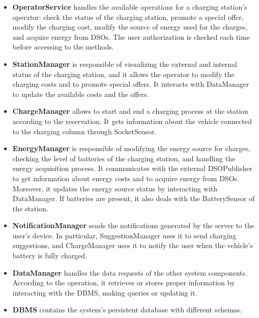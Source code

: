 \documentclass[../main.tex]{subfiles}
\begin{document}
\begin{itemize}
    \item \textbf{OperatorService} handles the available operations for a charging station's operator: check the status of the charging station, promote a special offer, modify the charging cost, modify the source of energy used for the charges, and acquire energy from DSOs. The user authorization is checked each time before accessing to the methods. 
    \item \textbf{StationManager} is responsible of visualizing the external and internal status of the charging station, and it allows the operator to modify the charging costs and to promote special offers. It interacts with DataManager to update the available costs and the offers. 
    \item \textbf{ChargeManager} allows to start and end a charging process at the station according to the reservation. It gets information about the vehicle connected to the charging column through SocketSensor.
    \item \textbf{EnergyManager} is responsible of modifying the energy source for charges, checking the level of batteries of the charging station, and handling the energy acquisition process. It communicates with the external DSOPublisher to get information about energy costs and to acquire energy from DSOs. Moreover, it updates the energy source status by interacting with DataManager. If batteries are present, it also deals with the BatterySensor of the station.

    \item \textbf{NotificationManager} sends the notifications generated by the server to the user's device. In particular, SuggestionManager uses it to send charging suggestions, and ChargeManager uses it to notify the user when the vehicle's battery is fully charged.
    
    \item \textbf{DataManager} handles the data requests of the other system components. According to the operation, it retrieves or stores proper information by interacting with the DBMS, making queries or updating it. 
    \item \textbf{DBMS} contains the system's persistent database with different schemas.

\end{itemize}


\newpage
\end{document}
